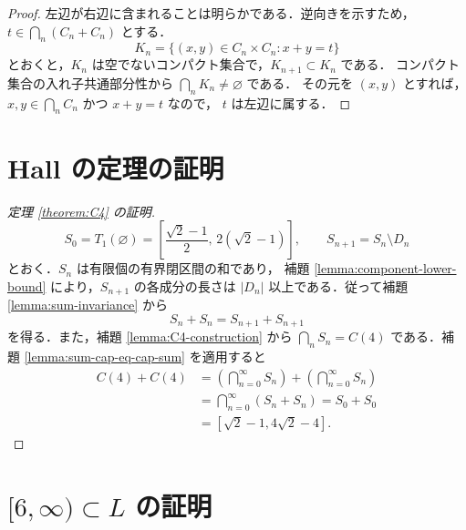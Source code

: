 \documentclass[10pt,a4paper]{ujarticle}
\newcommand{\length}[1]{\lvert #1\rvert}
\begin{document}
\begin{proof}
左辺が右辺に含まれることは明らかである．逆向きを示すため，
$t\in\bigcap_n(C_n+C_n)$ とする．
\[
  K_n=\{(x,y)\in C_n\times C_n:x+y=t\}
\]
とおくと，$K_n$ は空でないコンパクト集合で，$K_{n+1}\subset K_n$ である．
コンパクト集合の入れ子共通部分性から $\bigcap_nK_n\ne\varnothing$ である．
その元を $(x,y)$ とすれば，$x,y\in\bigcap_nC_n$ かつ $x+y=t$ なので，
$t$ は左辺に属する．
\end{proof}

\section{Hall の定理の証明}

\begin{proof}[定理 \ref{theorem:C4} の証明]
\[
  S_0=T_1(\varnothing)
  =
  \left[\frac{\sqrt2-1}{2},\,2(\sqrt2-1)\right],
  \qquad
  S_{n+1}=S_n\setminus D_n
\]
とおく．$S_n$ は有限個の有界閉区間の和であり，
補題 \ref{lemma:component-lower-bound} により，$S_{n+1}$ の各成分の長さは
$\length{D_n}$ 以上である．従って補題 \ref{lemma:sum-invariance} から
\[
  S_n+S_n=S_{n+1}+S_{n+1}
\]
を得る．また，補題 \ref{lemma:C4-construction} から
$\bigcap_nS_n=C(4)$ である．補題 \ref{lemma:sum-cap-eq-cap-sum} を適用すると
\begin{align*}
  C(4)+C(4)
  &=
  \left(\bigcap_{n=0}^{\infty}S_n\right)
  +
  \left(\bigcap_{n=0}^{\infty}S_n\right)\\
  &=
  \bigcap_{n=0}^{\infty}(S_n+S_n)
   =S_0+S_0\\
  &=[\sqrt2-1,4\sqrt2-4].
\end{align*}
\end{proof}

\section{$[6,\infty)\subset L$ の証明}
\end{document}
